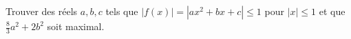 Trouver des réels $a, b, c$ tels que $|f(x)| = |ax^2 + bx + c| \leq 1$ pour $|x| \leq 1$ et que $\frac{8}{3}a^2 + 2b^2$ soit maximal.
